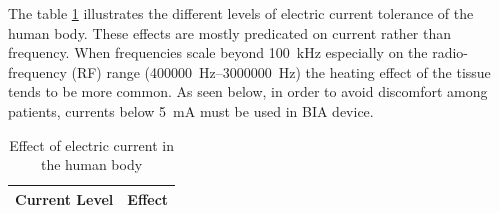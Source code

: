 The table \ref{table:current in body} illustrates the different levels of electric current tolerance of the human body. These effects are mostly predicated on current rather than frequency. When frequencies scale beyond \SI{100}{\kilo\hertz} especially on the radio-frequency (RF) range (\SIrange[scientific-notation = engineering]{400000}{3000000}{\hertz}) the heating effect of the tissue tends to be more common. As seen below, in order to avoid discomfort among patients, currents below \SI{5}{\milli\ampere} must be used in BIA device.

\begin{table}[!htpb]
	\caption{Effect of electric current in the human body}
	\centering
	\label{table:current in body}
	\begin{tabular}{lp{}}
		\toprule
		\textbf{Current Level}                &         \textbf{Effect}          \\ \midrule
		

\end{tabular}
\end{table}
